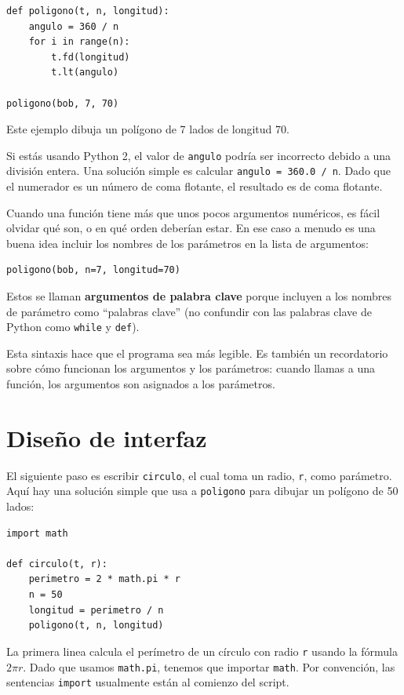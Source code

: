\documentclass[10pt]{book}
\begin{document}
\begin{verbatim}
def poligono(t, n, longitud):
    angulo = 360 / n
    for i in range(n):
        t.fd(longitud)
        t.lt(angulo)

poligono(bob, 7, 70)
\end{verbatim}
%
Este ejemplo dibuja un polígono de 7 lados de longitud 70.

Si estás usando Python 2, el valor de {\tt angulo} podría ser incorrecto
debido a una división entera.  Una solución simple es calcular
{\tt angulo = 360.0 / n}.  Dado que el numerador es un número de
coma flotante, el resultado es de coma flotante.

Cuando una función tiene más que unos pocos argumentos numéricos, es fácil
olvidar qué son, o en qué orden deberían estar.  En ese caso
a menudo es una buena idea incluir los nombres de los parámetros en la
lista de argumentos:

\begin{verbatim}
poligono(bob, n=7, longitud=70)
\end{verbatim}
%
Estos se llaman {\bf argumentos de palabra clave} porque incluyen
a los nombres de parámetro como ``palabras clave'' (no confundir con
las palabras clave de Python como {\tt while} y {\tt def}).

Esta sintaxis hace que el programa sea más legible.  Es también un recordatorio
sobre cómo funcionan los argumentos y los parámetros: cuando llamas a una función, los
argumentos son asignados a los parámetros.


\section{Diseño de interfaz}

El siguiente paso es escribir {\tt circulo}, el cual toma un radio,
{\tt r}, como parámetro.  Aquí hay una solución simple que usa a
{\tt poligono} para dibujar un polígono de 50 lados:

\begin{verbatim}
import math

def circulo(t, r):
    perimetro = 2 * math.pi * r
    n = 50
    longitud = perimetro / n
    poligono(t, n, longitud)
\end{verbatim}
%
La primera linea calcula el perímetro de un círculo con radio
{\tt r} usando la fórmula $2 \pi r$.  Dado que usamos {\tt math.pi},
tenemos que importar {\tt math}.  Por convención, las sentencias {\tt import}
usualmente están al comienzo del script.
\end{document}
